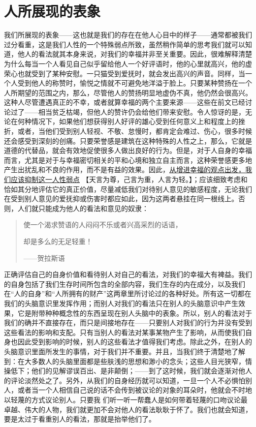 \documentclass[12pt,oneside]{book}
\begin{document}
 

\chapter{人所展现的表象 }
我们所展现的表象——这也就是我们的存在在他人心目中的样子——通常都被我们过分看重，这是我们人性的一个特殊弱点所致，虽然稍作简单的思考我们就可以知道，他人的看法就其本身来说，对我们的幸福并非至关重要。因此，很难解释清楚为什么每当一个人看见自己似乎留给他人一个好评语时，他的心里就高兴，他的虚荣心也就受到了某种安慰。一只猫受到爱抚时，就会发出高兴的声音。同样，当一个人受到他人的称赞时，愉悦之情就不可避免地洋溢于脸上。只要某种赞扬在一个人所期望的范围之内，那么，尽管他人的赞扬明显地虚伪不真，他仍然会很高兴。这种人尽管遭遇真正的不幸，或者就算幸福的两个主要来源——这些在前文已经讨论过了——相当贫乏枯竭，但他人的赞许仍会给他们带来安慰。令人惊讶的是，无论在何种情况下，如果他们想获得别人好评的雄心受到任何意义上和程度上的挫折，或者，当他们受到别人轻视、不敬、怠慢时，都肯定会难过、伤心，很多时候还会感受到深刻的创痛。只要荣誉感是建筑在这种特殊的人性之上，那么，它就是道德的代替品，就会有效地促使很多人做出良好的行为。但是，对于人自身的幸福而言，尤其是对于与幸福密切相关的平和心境和独立自主而言，这种荣誉感更多地产生出扰乱和不良的作用，而不是有益的效果。因此，\uline{从增进幸福的观点出发，我们应该抑制这一人性弱点} 【天言为尊，己言为重，人言为轻。】；应该细致考虑和恰如其分地评估它的真正价值，尽量减低我们对待别人意见的敏感程度，无论我们在受到别人意见的爱抚抑或伤害时都应如此，因为这两者悬挂在同一根线上。否则，人们就只能成为他人的看法和意见的奴隶： 

 
\begin{quotation}
使一个渴求赞语的人闷闷不乐或者兴高采烈的话语， 

却是多么的无足轻重！ 

——贺拉斯语 
\end{quotation}


正确评估自己的自身价值和看待别人对自己的看法，对我们的幸福大有裨益。我们的自身包括了我们生存时间所包含的全部内容，我们生存的内在成分，以及我们在“人的自身”和“人所拥有的财产”这两章里所讨论过的各种好处。所有这一切都在我们的头脑意识里发挥作用；而别人对我们的看法只在别人的头脑意识中产生效果，它是附带种种概念性的东西呈现在别人头脑中的表象。所以，别人的看法对于我们的确并不直接存在，而只是间接地存在——只要别人对我们的行为并没有受到这些看法的影响和支配。只有当别人的看法对某事某物产生了影响，从而使我们自身也因此受到影响的时候，别人的这些看法才值得我们考虑。除此之外，在别人的头脑意识里面所发生的事情，对于我们并不重要。并且，当我们终于清楚地了解到：在大多数人的头脑里面都是些肤浅的思想和渺小的念头；这些人目光狭窄，情操低下；他们的见解谬误百出、是非颠倒；——到了这时候，我们就会逐渐对他人的评论淡然处之了。另外，从我们的自身经历就可以知道，一旦一个人不必惧怕别人，或者当一个人相信自己说的话不会传到被议论的对象的耳朵时，他就会不时地以轻蔑的方式议论别人。只要我
们听一听一帮蠢人是如何带着轻蔑的口吻议论最卓越、伟大的人物，我们就更加不会对他人的看法耿耿于怀了。我们也就会知道，要是太过于看重别人的看法，那就是抬举他们了。 
\end{document}

